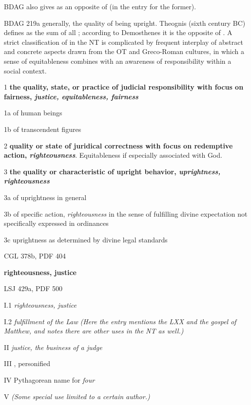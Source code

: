 				BDAG also gives  as an opposite of  (in the entry for the former).
			
				\begin{compactdesc}
					\item[BDAG 219a] generally, the quality of being upright. Theognis (sixth century BC) defines  as the sum of all ; according to Demosthenes it is the opposite of . A strict classification of  in the NT is complicated by frequent interplay of abstract and concrete aspects drawn from the OT and Greco-Roman cultures, in which a sense of equitableness combines with an awareness of responsibility within a social context.
						\begin{compactitem}
							\item[1] \textbf{the quality, state, or practice of judicial responsibility with focus on fairness, \textit{justice, equitableness, fairness}}
							\item[1a] of human beings
							\item[1b] of transcendent figures
							\item[2] \textbf{quality or state of juridical correctness with focus on redemptive action, \textit{righteousness}}. Equitableness if especially associated with God.
							\item[3] \textbf{the quality or characteristic of upright behavior, \textit{uprightness, righteousness}}
							\item[3a] of uprightness in general
							\item[3b] of specific action, \textit{righteousness} in the sense of fulfilling divine expectation not specifically expressed in ordinances
							\item[3c] uprightness as determined by divine legal standards
						\end{compactitem}
					\item[CGL 378b, PDF 404] \textbf{}
						\begin{compactitem}
							\item \textbf{righteousness, justice}
						\end{compactitem}
					\item[LSJ 429a, PDF 500] \textbf{}
						\begin{compactitem}
							\item[I.1] \textit{righteousness, justice}
							\item[I.2] \textit{fulfillment of the Law} \textit{(Here the entry mentions the LXX and the gospel of Matthew, and notes there are other uses in the NT as well.)}
							\item[II] \textit{justice, the business of a judge}
							\item[III] , personified
							\item[IV] Pythagorean name for \textit{four}
							\item[V] \textit{(Some special use limited to a certain author.)}
						\end{compactitem}
				\end{compactdesc}
				
